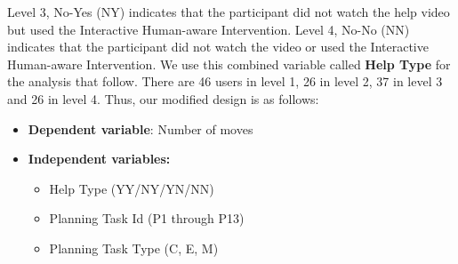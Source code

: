 Level 3, No-Yes (NY) indicates that the participant did not watch the help video but used the Interactive Human-aware Intervention.
Level 4, No-No (NN) indicates that the participant did not watch the video or used the Interactive Human-aware Intervention.
We use this combined variable called \textbf{Help Type} for the analysis that follow.
There are 46 users in level 1, 26 in level 2, 37 in level 3 and 26 in level 4.
Thus, our modified design is as follows:
\begin{itemize}
\item \textbf{Dependent variable}: Number of moves
\item \textbf{Independent variables:}
\begin{itemize}
\item Help Type (YY/NY/YN/NN)
\item Planning Task Id (P1 through P13)
\item Planning Task Type (C, E, M)
\end{itemize}
\end{itemize}

